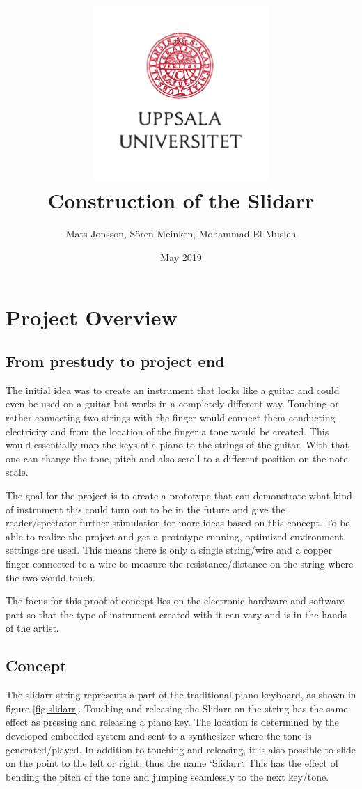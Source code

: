 \documentclass{article}
\title{\includegraphics[width=0.5\textwidth]{UU_logo.pdf}\\
Construction of the Slidarr}
\author{Mats Jonsson, Sören Meinken, Mohammad El Musleh}
\date{May 2019}
\begin{document}
\maketitle

\pagebreak

\tableofcontents

\pagebreak

\section{Project Overview}

\subsection{From prestudy to project end}
The initial idea was to create an instrument that looks like a guitar and could even be used on a guitar but works in a completely different way. Touching or rather connecting two strings with the finger would connect them conducting electricity and from the location of the finger a tone would be created. This would essentially map the keys of a piano to the strings of the guitar. With that one can change the tone, pitch and also scroll to a different position on the note scale.

The goal for the project is to create a prototype that can demonstrate what kind of instrument this could turn out to be in the future and give the reader/spectator further stimulation for more ideas based on this concept. To be able to realize the project and get a prototype running, optimized environment settings are used. This means there is only a single string/wire and a copper finger connected to a wire to measure the resistance/distance on the string where the two would touch.

The focus for this proof of concept lies on the electronic hardware and software part so that the type of instrument created with it can vary and is in the hands of the artist.


\subsection{Concept}

The slidarr string represents a part of the traditional piano keyboard, as shown in figure \ref{fig:slidarr}. Touching and releasing the Slidarr on the string has the same effect as pressing and releasing a piano key. The location is determined by the developed embedded system and sent to a synthesizer where the tone is generated/played. In addition to touching and releasing, it is also possible to slide on the point to the left or right, thus the name `Slidarr`. This has the effect of bending the pitch of the tone and jumping seamlessly to the next key/tone. 
\end{document}
